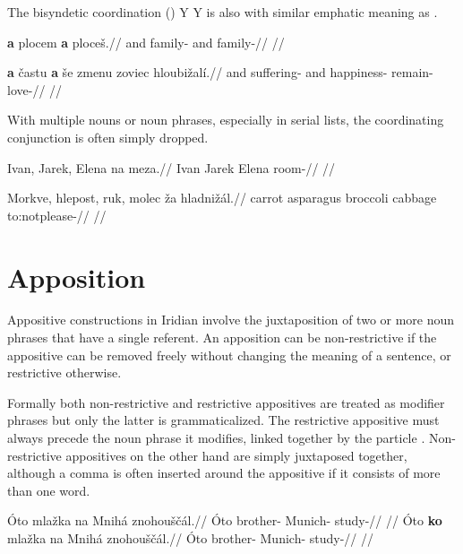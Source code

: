 The bisyndetic coordination (\cite{velupillai2012})  Y  Y is also with similar emphatic meaning as .

\pex
\begingl
    \gla \textbf{a} plocem \textbf{a} ploce\v{s}.//
    \glb and family- and family-//
    \glft {}//
\endgl
\xe

\pex
\begingl
    \gla \textbf{a} \v{c}astu \textbf{a} \v{s}e zmenu zoviec hloubi\v{z}al\'i.//
    \glb and suffering-\mk{} and  happiness- remain- love-//
    \glft {}//
\endgl
\xe

With multiple nouns or noun phrases, especially in serial lists, the coordinating conjunction is often simply dropped.

\pex
\begingl
    \gla Ivan, Jarek, Elena na meza.//
    \glb Ivan Jarek Elena  room-//
    \glft {}//
\endgl
\xe

\pex
\begingl
    \gla Morkve, hlepost, ruk, molec \v{z}a hladni\v{z}\'al.//
    \glb carrot asparagus broccoli cabbage  to:notplease-//
    \glft {}//
\endgl
\xe

\section{Apposition}\label{sec:apposition}

Appositive constructions in Iridian involve the juxtaposition of two or more noun phrases that have a single referent. An apposition can be non-restrictive if the appositive can be removed freely without changing the meaning of a sentence, or restrictive otherwise.

Formally both non-restrictive and restrictive appositives are treated as modifier phrases but only the latter is grammaticalized. The restrictive appositive must always precede the noun phrase it modifies, linked together by the particle . Non-restrictive appositives on the other hand are simply juxtaposed together, although a comma is often inserted around the appositive if it consists of more than one word.

\pex\a
\begingl{}
    \gla \'Oto mla\v{z}ka na Mnih\'a znohou\v{s}\v{c}\'al.//
    \glb  \'Oto brother-  Munich- study-//
    \glft {}//
\endgl
\a\begingl{}
    \gla \'Oto \textbf{ko} mla\v{z}ka na Mnih\'a znohou\v{s}\v{c}\'al.//
    \glb  \'Oto  brother-  Munich- study-//
    \glft {}//
\endgl
\xe

